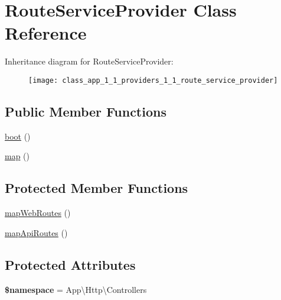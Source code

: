\hypertarget{class_app_1_1_providers_1_1_route_service_provider}{}\section{Route\+Service\+Provider Class Reference}
\label{class_app_1_1_providers_1_1_route_service_provider}
Inheritance diagram for Route\+Service\+Provider\+:\begin{figure}[H]
\begin{center}
\leavevmode
\texttt{[image: class\_app\_1\_1\_providers\_1\_1\_route\_service\_provider]}
\end{center}
\end{figure}
\subsection*{Public Member Functions}
\begin{DoxyCompactItemize}
\item 
\mbox{\hyperlink{class_app_1_1_providers_1_1_route_service_provider_a8814ea4b5beba763c570b4818980814e}{boot}} ()
\item 
\mbox{\hyperlink{class_app_1_1_providers_1_1_route_service_provider_a7f35c814c022f4191d359b5dc139d35b}{map}} ()
\end{DoxyCompactItemize}
\subsection*{Protected Member Functions}
\begin{DoxyCompactItemize}
\item 
\mbox{\hyperlink{class_app_1_1_providers_1_1_route_service_provider_ac887962db9a9a8f344572bd205a02165}{map\+Web\+Routes}} ()
\item 
\mbox{\hyperlink{class_app_1_1_providers_1_1_route_service_provider_ad400e7ca0cea76b9680eeb68b55ea0e0}{map\+Api\+Routes}} ()
\end{DoxyCompactItemize}
\subsection*{Protected Attributes}
\begin{DoxyCompactItemize}
\item 
\mbox{\label{class_app_1_1_providers_1_1_route_service_provider_a3825c9b9060c2d6ef594385997cd60aa}} 
{\bfseries \$namespace} = \textquotesingle{}App\textbackslash{}\+Http\textbackslash{}\+Controllers\textquotesingle{}
\end{DoxyCompactItemize}


